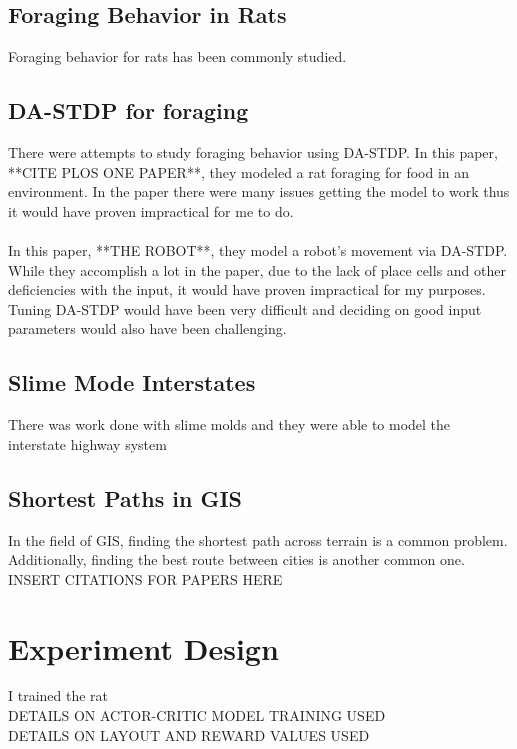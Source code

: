 \documentclass[conference]{IEEEtran}
\begin{document}
\subsection{Foraging Behavior in Rats}
Foraging behavior for rats has been commonly studied.

\subsection{DA-STDP for foraging}

There were attempts to study foraging behavior using DA-STDP. In this paper, **CITE PLOS ONE PAPER**, they modeled a rat foraging for food in an environment. In the paper there were many issues getting the model to work thus it would have proven impractical for me to do. \\
\\
In this paper, **THE ROBOT**, they model a robot's movement via DA-STDP. While they accomplish a lot in the paper, due to the lack of place cells and other deficiencies with the input, it would have proven impractical for my purposes. Tuning DA-STDP would have been very difficult and deciding on good input parameters would also have been challenging. \\

\subsection{Slime Mode Interstates}

There was work done with slime molds and they were able to model the interstate highway system

\subsection{Shortest Paths in GIS}

In the field of GIS, finding the shortest path across terrain is a common problem. Additionally, finding the best route between cities is another common one. INSERT CITATIONS FOR PAPERS HERE

\section{Experiment Design}

I trained the rat\\
DETAILS ON ACTOR-CRITIC MODEL TRAINING USED\\
DETAILS ON LAYOUT AND REWARD VALUES USED\\
\end{document}
